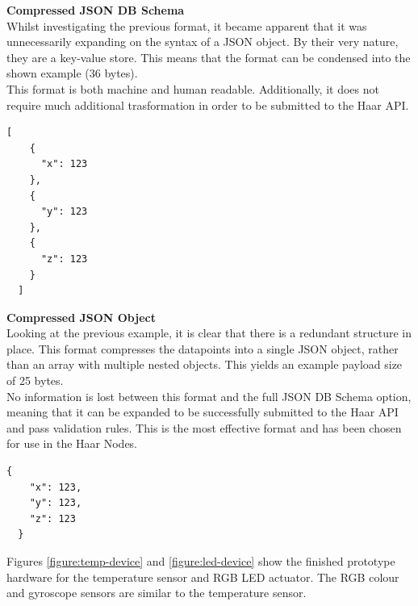       \noindent
      \begin{minipage}[t]{0.45\textwidth}
        \textbf{Compressed JSON DB Schema}\\
        Whilst investigating the previous format, it became apparent that it was unnecessarily expanding on the syntax of a JSON object. By their very nature, they are a key-value store. This means that the format can be condensed into the shown example (36 bytes).\\

        This format is both machine and human readable. Additionally, it does not require much additional trasformation in order to be submitted to the Haar API.\\
      \end{minipage}
      \hfill
      \begin{minipage}[t]{0.45\textwidth}
        \begin{lstlisting}[frame=single]
  [
    {
      "x": 123
    },
    {
      "y": 123
    },
    {
      "z": 123
    }
  ]
        \end{lstlisting}
      \end{minipage}

      \noindent
      \begin{minipage}[t]{0.45\textwidth}
        \textbf{Compressed JSON Object}\\
        Looking at the previous example, it is clear that there is a redundant structure in place. This format compresses the datapoints into a single JSON object, rather than an array with multiple nested objects. This yields an example payload size of 25 bytes.\\

        No information is lost between this format and the full JSON DB Schema option, meaning that it can be expanded to be successfully submitted to the Haar API and pass validation rules. This is the most effective format and has been chosen for use in the Haar Nodes. 
      \end{minipage}
      \hfill
      \begin{minipage}[t]{0.45\textwidth}
        \begin{lstlisting}[frame=single]
  {
    "x": 123,
    "y": 123,
    "z": 123
  }
        \end{lstlisting}
      \end{minipage}

      Figures \ref{figure:temp-device} and \ref{figure:led-device} show the finished prototype hardware for the temperature sensor and RGB LED actuator. The RGB colour and gyroscope sensors are similar to the temperature sensor. 


